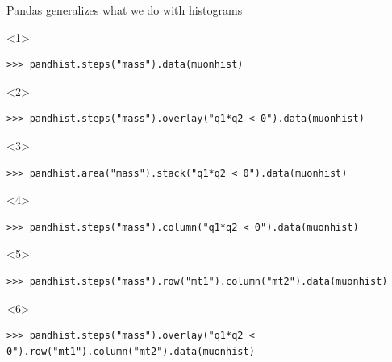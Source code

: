 \documentclass[aspectratio=169]{beamer}
\begin{document}
\begin{frame}[fragile]{Pandas generalizes what we do with histograms}
\small
\begin{onlyenv}<1>
\begin{verbatim}
>>> pandhist.steps("mass").data(muonhist)
\end{verbatim}
\end{onlyenv}
\begin{onlyenv}<2>
\begin{verbatim}
>>> pandhist.steps("mass").overlay("q1*q2 < 0").data(muonhist)
\end{verbatim}
\end{onlyenv}
\begin{onlyenv}<3>
\begin{verbatim}
>>> pandhist.area("mass").stack("q1*q2 < 0").data(muonhist)
\end{verbatim}
\end{onlyenv}
\begin{onlyenv}<4>
\begin{verbatim}
>>> pandhist.steps("mass").column("q1*q2 < 0").data(muonhist)
\end{verbatim}
\end{onlyenv}
\begin{onlyenv}<5>
\begin{verbatim}
>>> pandhist.steps("mass").row("mt1").column("mt2").data(muonhist)
\end{verbatim}
\end{onlyenv}
\begin{onlyenv}<6>
\scriptsize
\begin{verbatim}
>>> pandhist.steps("mass").overlay("q1*q2 < 0").row("mt1").column("mt2").data(muonhist)
\end{verbatim}
\end{onlyenv}


\end{frame}
\end{document}
